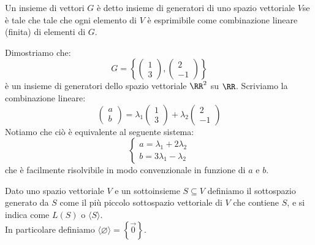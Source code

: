 \documentclass[11pt]{scrartcl}
\newcommand{\eset}{\varnothing}
\begin{document}
	\begin{definition}
		Un insieme di vettori $G$ è detto insieme di generatori di uno spazio vettoriale $V$se è tale che tale che ogni elemento di $V$ è esprimibile come combinazione lineare (finita) di elementi di $G$.
	\end{definition}
	\begin{example}
		Dimostriamo che:
		$$
		G=\left\{
		\begin{pmatrix} 1 \\ 3 \end{pmatrix},\begin{pmatrix}2 \\ -1\end{pmatrix}
		\right\}
		$$
		è un insieme di generatori dello spazio vettoriale $\RR^2$ su $\RR$. Scriviamo la combinazione lineare:
		$$\begin{pmatrix} a \\ b \end{pmatrix}=\lambda_1\begin{pmatrix} 1 \\ 3 \end{pmatrix}+\lambda_2\begin{pmatrix}2 \\ -1\end{pmatrix}$$
		Notiamo che ciò è equivalente al seguente sistema:
		$$\begin{cases}
			a=\lambda_1+2\lambda_2 \\
			b= 3\lambda_1 - \lambda_2
		\end{cases}$$
		che è facilmente risolvibile in modo convenzionale in funzione di $a$ e $b$.
	\end{example}
	\begin{definition}
		Dato uno spazio vettoriale $V$ e un sottoinsieme $S\subseteq V$ definiamo il sottospazio generato da $S$ come il più piccolo sottospazio vettoriale di $V$ che contiene $S$, e si indica come $L(S)$ o $\langle S \rangle$. \\
		In particolare definiamo $\langle \eset \rangle = \left\{\vec{0}\right\}$.
	\end{definition}
	
\end{document}
